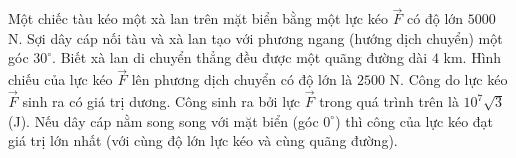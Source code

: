 \begin{ex}
Một chiếc tàu kéo một xà lan trên mặt biển bằng một lực kéo $\overrightarrow{F}$ có độ lớn $5000$ N. Sợi dây cáp nối tàu và xà lan tạo với phương ngang (hướng dịch chuyển) một góc $30^\circ$. Biết xà lan di chuyển thẳng đều được một quãng đường dài $4$ km.
\choiceTF
{Hình chiếu của lực kéo $\overrightarrow{F}$ lên phương dịch chuyển có độ lớn là $2500$ N.}
{\True Công do lực kéo $\overrightarrow{F}$ sinh ra có giá trị dương.}
{\True Công sinh ra bởi lực $\overrightarrow{F}$ trong quá trình trên là $10^7\sqrt3$ (J).}
{\True Nếu dây cáp nằm song song với mặt biển (góc $0^\circ$) thì công của lực kéo đạt giá trị lớn nhất (với cùng độ lớn lực kéo và cùng quãng đường).}
\end{ex}
